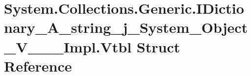 \hypertarget{struct_system_1_1_collections_1_1_generic_1_1_i_dictionary___a__string__j___system___object___v_______impl_1_1_vtbl}{}\section{System.\+Collections.\+Generic.\+I\+Dictionary\+\_\+\+A\+\_\+string\+\_\+j\+\_\+\+System\+\_\+\+Object\+\_\+\+V\+\_\+\+\_\+\+\_\+\+Impl.\+Vtbl Struct Reference}
\label{struct_system_1_1_collections_1_1_generic_1_1_i_dictionary___a__string__j___system___object___v_______impl_1_1_vtbl}
